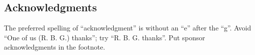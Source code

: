 \documentclass{article}
\begin{document}
\begin{sloppy}
\section{Acknowledgments}
\label{sec:ack}
The preferred spelling of ``acknowledgment'' is without an “e” after the “g”. Avoid ``One of us (R. B. G.) thanks''; try ``R. B. G. thanks''. Put sponsor acknowledgments in the footnote.


{\footnotesize}
%
%
% 
%
%
%
% 
%
% 
% 

\end{sloppy}
\end{document}
